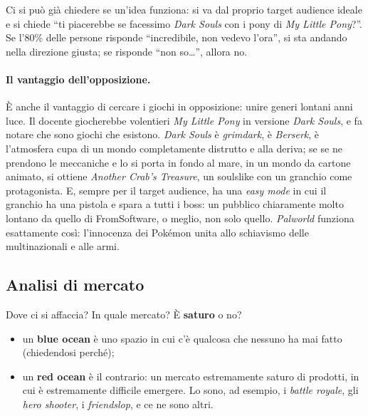 Ci si può già chiedere se un'idea funziona: si va dal proprio target
audience ideale e si chiede ``ti piacerebbe se facessimo \emph{Dark Souls}
con i pony di \emph{My Little Pony}?''. Se l'80\% delle persone risponde
``incredibile, non vedevo l'ora'', si sta andando nella direzione giusta; se
risponde ``non so\dots'', allora no.

\paragraph{Il vantaggio dell'opposizione.} È anche il vantaggio di cercare i
giochi in opposizione: unire generi lontani anni luce. Il docente giocherebbe
volentieri \emph{My Little Pony} in versione \emph{Dark Souls}, e fa notare
che sono giochi che esistono. \emph{Dark Souls} è \emph{grimdark}, è
\emph{Berserk}, è l'atmosfera cupa di un mondo completamente distrutto e alla
deriva; se se ne prendono le meccaniche e lo si porta in fondo al mare, in un
mondo da cartone animato, si ottiene \emph{Another Crab's Treasure}, un
soulslike con un granchio come protagonista. E, sempre per il target
audience, ha una \emph{easy mode} in cui il granchio ha una pistola e spara a
tutti i boss: un pubblico chiaramente molto lontano da quello di FromSoftware,
o meglio, non solo quello. \emph{Palworld} funziona esattamente così:
l'innocenza dei Pokémon unita allo schiavismo delle multinazionali e alle
armi.

\subsection{Analisi di mercato}

Dove ci si affaccia? In quale mercato? È \textbf{saturo} o no?
\begin{itemize}
  \item un \textbf{blue ocean} è uno spazio in cui c'è qualcosa che nessuno ha
        mai fatto (chiedendosi perché);
  \item un \textbf{red ocean} è il contrario: un mercato estremamente saturo
        di prodotti, in cui è estremamente difficile emergere. Lo sono, ad
        esempio, i \emph{battle royale}, gli \emph{hero shooter}, i
        \emph{friendslop}, e ce ne sono altri.
\end{itemize}

